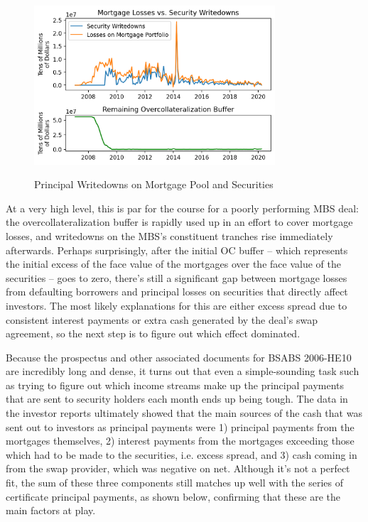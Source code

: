 \documentclass[12pt]{article}
\begin{document}
\begin{figure}[h]
	\centering
	\caption{Principal Writedowns on Mortgage Pool and Securities}
	\includegraphics[width=0.8\textwidth]{../figures/timeseries_losses_vs_writedowns}
	\label{fig:timeseries_losses_vs_writedowns}
\end{figure}

At a very high level, this is par for the course for a poorly performing MBS deal: the overcollateralization buffer is rapidly used up in an effort to cover mortgage losses, and writedowns on the MBS’s constituent tranches rise immediately afterwards. Perhaps surprisingly, after the initial OC buffer – which represents the initial excess of the face value of the mortgages over the face value of the securities – goes to zero, there’s still a significant gap between mortgage losses from defaulting borrowers and principal losses on securities that directly affect investors. The most likely explanations for this are either excess spread due to consistent interest payments or extra cash generated by the deal’s swap agreement, so the next step is to figure out which effect dominated.

	Because the prospectus and other associated documents for BSABS 2006-HE10 are incredibly long and dense, it turns out that even a simple-sounding task such as trying to figure out which income streams make up the principal payments that are sent to security holders each month ends up being tough. The data in the investor reports ultimately showed that the main sources of the cash that was sent out to investors as principal payments were 1) principal payments from the mortgages themselves, 2) interest payments from the mortgages exceeding those which had to be made to the securities, i.e. excess spread, and 3) cash coming in from the swap provider, which was negative on net. Although it’s not a perfect fit, the sum of these three components still matches up well with the series of certificate principal payments, as shown below, confirming that these are the main factors at play.
\end{document}
